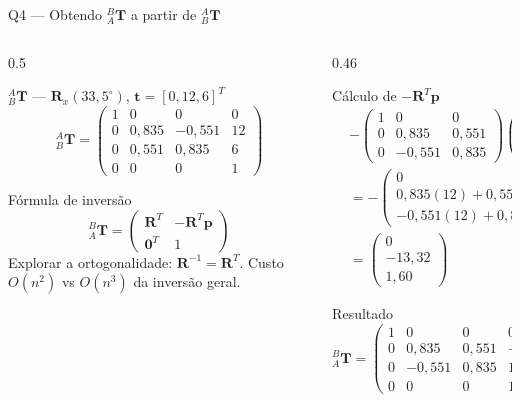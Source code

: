 \documentclass[aspectratio=169,12pt]{beamer}
\newcommand{\Rx}[1]{\mathbf{R}_x(#1)}
\newcommand{\Trans}[2]{{}^{#1}_{#2}\!\mathbf{T}}
\newcommand{\degr}{^{\circ}}
\newcommand{\mat}[1]{\begin{pmatrix}#1\end{pmatrix}}
\begin{document}
\begin{frame}{Q4 --- Obtendo ${}^{B}_{A}\mathbf{T}$ a partir de ${}^{A}_{B}\mathbf{T}$}
  \begin{columns}
    \begin{column}{0.5\textwidth}
      \begin{block}{${}^{A}_{B}\mathbf{T}$ — $\Rx{33{,}5\degr}$, $\mathbf{t}=[0,12,6]^T$}
        \[
          \Trans{A}{B}=\mat{
            1&0&0&0\\
            0&0{,}835&-0{,}551&12\\
            0&0{,}551&0{,}835&6\\
            0&0&0&1}
        \]
      \end{block}
      \begin{block}{Fórmula de inversão}
        \[
          \Trans{B}{A}=\mat{\mathbf{R}^T & -\mathbf{R}^T\mathbf{p}\\\mathbf{0}^T&1}
        \]
        \small Explorar a ortogonalidade: $\mathbf{R}^{-1}=\mathbf{R}^T$. Custo $O(n^2)$ vs $O(n^3)$ da inversão geral.
      \end{block}
    \end{column}
    \begin{column}{0.46\textwidth}
      \begin{block}{Cálculo de $-\mathbf{R}^T\mathbf{p}$}
        \small
        \begin{align*}
          &-\mat{1&0&0\\0&0{,}835&0{,}551\\0&-0{,}551&0{,}835}\mat{0\\12\\6}\\[4pt]
          &= -\mat{0\\0{,}835(12)+0{,}551(6)\\-0{,}551(12)+0{,}835(6)}\\
          &= \mat{0\\-13{,}32\\1{,}60}
        \end{align*}
      \end{block}
      \begin{exampleblock}{Resultado}
        \tiny
        $\Trans{B}{A}=\mat{1&0&0&0\\0&0{,}835&0{,}551&-13{,}32\\0&-0{,}551&0{,}835&1{,}60\\0&0&0&1}$
      \end{exampleblock}
    \end{column}
  \end{columns}
\end{frame}
\end{document}
